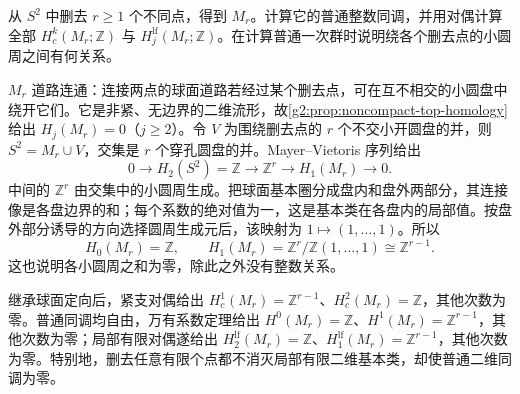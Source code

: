 \begin{exercise}\label{g2:ex:punctured-sphere-duality}
	从 \(S^2\) 中删去 \(r\geq1\) 个不同点，得到 \(M_r\)。计算它的普通整数同调，并用对偶计算全部 \(H_c^k(M_r;\mathbb Z)\) 与 \(H_j^{\mathrm{lf}}(M_r;\mathbb Z)\)。在计算普通一次群时说明绕各个删去点的小圆周之间有何关系。
\end{exercise}
\begin{solution}
	\(M_r\) 道路连通：连接两点的球面道路若经过某个删去点，可在互不相交的小圆盘中绕开它们。它是非紧、无边界的二维流形，故\cref{g2:prop:noncompact-top-homology}给出 \(H_j(M_r)=0\)（\(j\geq2\)）。令 \(V\) 为围绕删去点的 \(r\) 个不交小开圆盘的并，则 \(S^2=M_r\cup V\)，交集是 \(r\) 个穿孔圆盘的并。Mayer--Vietoris 序列给出
	\[
		0\longrightarrow H_2(S^2)=\mathbb Z\longrightarrow\mathbb Z^r
		\longrightarrow H_1(M_r)\longrightarrow0.
	\]
	中间的 \(\mathbb Z^r\) 由交集中的小圆周生成。把球面基本圈分成盘内和盘外两部分，其连接像是各盘边界的和；每个系数的绝对值为一，这是基本类在各盘内的局部值。按盘外部分诱导的方向选择圆周生成元后，该映射为 \(1\mapsto(1,\ldots,1)\)。所以
	\[
		H_0(M_r)=\mathbb Z,\qquad H_1(M_r)=\mathbb Z^r/\mathbb Z(1,\ldots,1)\cong\mathbb Z^{r-1}.
	\]
	这也说明各小圆周之和为零，除此之外没有整数关系。

	继承球面定向后，紧支对偶给出 \(H_c^1(M_r)=\mathbb Z^{r-1}\)、\(H_c^2(M_r)=\mathbb Z\)，其他次数为零。普通同调均自由，万有系数定理给出 \(H^0(M_r)=\mathbb Z\)、\(H^1(M_r)=\mathbb Z^{r-1}\)，其他次数为零；局部有限对偶遂给出 \(H_2^{\mathrm{lf}}(M_r)=\mathbb Z\)、\(H_1^{\mathrm{lf}}(M_r)=\mathbb Z^{r-1}\)，其他次数为零。特别地，删去任意有限个点都不消灭局部有限二维基本类，却使普通二维同调为零。
\end{solution}

